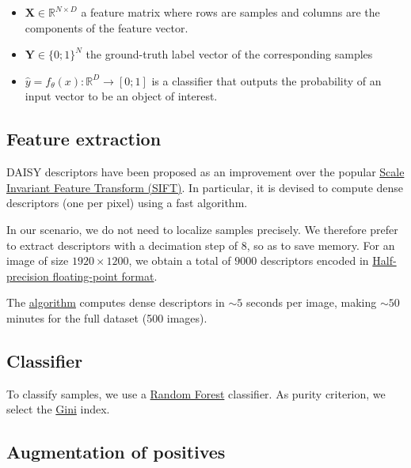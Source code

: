 \documentclass[11pt]{article}
\begin{document}
\begin{itemize}
\item \(\bm{X} \in \mathbb{R}^{N \times D}\) a feature matrix where rows are samples and columns
are the components of the feature vector.
\item \(\bm{Y} \in \{0;1\}^N\) the ground-truth label vector of the corresponding samples
\item \(\hat{y}= f_{\theta}(x): \mathbb{R}^{D} \rightarrow [0;1]\) is a classifier that outputs the probability of an input vector to be an object of interest.
\end{itemize}

\subsection{Feature extraction}
\label{sec:orge3e1686}

DAISY descriptors have been proposed as an improvement over the popular \href{https://en.wikipedia.org/wiki/Scale-invariant\_feature\_transform}{Scale Invariant Feature Transform (SIFT)}.
In particular, it is devised to compute dense descriptors (one per pixel) using a fast algorithm.

In our scenario, we do not need to localize samples precisely.
We therefore prefer to extract descriptors with a decimation step of \(8\), so as to save memory.
For an image of size \(1920 \times 1200\), we obtain a total of \(9000\) descriptors encoded in \href{https://en.wikipedia.org/wiki/Half-precision\_floating-point\_format}{Half-precision floating-point format}.

The \href{https://github.com/scikit-image/scikit-image/blob/main/skimage/feature/\_daisy.py\#L9-L222}{algorithm} computes dense descriptors in \(\sim 5\) seconds per image, making \(\sim 50\) minutes for the full dataset (500 images).

\subsection{Classifier}
\label{sec:org07d4a2b}

To classify samples, we use a \href{https://en.wikipedia.org/wiki/Random\_forest}{Random Forest} classifier.
As purity criterion, we select the \href{https://en.wikipedia.org/wiki/Gini\_coefficient}{Gini} index.

\subsection{Augmentation of positives}
\label{sec:org6e9b963}
\end{document}
